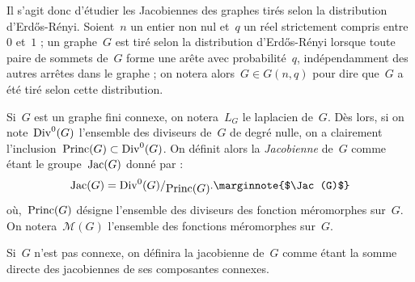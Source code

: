 \vspace*{0.3cm}
	Il s'agit donc d'étudier les Jacobiennes des graphes tirés selon la distribution d'Erd\H{o}s-Rényi. Soient~$n$ un entier non nul et~$q$ un réel strictement compris entre~$0$ et~$1$ ; un graphe~$G$ est tiré selon la distribution d'Erd\H{o}s-Rényi lorsque toute paire de sommets de~$G$ forme une arête avec probabilité~$q$, indépendamment des autres arrêtes dans le graphe ; on notera alors~$G\in G(n,q)$ pour dire que~$G$ a été tiré selon cette distribution.
	
	Si~$G$ est un graphe fini connexe, on notera~$L_G$ le laplacien de~$G$. Dès lors, si on note~$\operatorname{Div}^0(G)$ l'ensemble des diviseurs de~$G$ de degré nulle, on a clairement l'inclusion~$\operatorname{Princ}(G) \subset \operatorname{Div}^0(G)$. On définit alors la \emph{Jacobienne} de~$G$ comme étant le groupe~$\operatorname{Jac}(G)$ donné par :
	\[
		\Jac(G) = \quotient{\Div^0(G)}{\Princ(G)}.\text{\marginnote{$\Jac(G)$}}
	\]
	où,~$\operatorname{Princ}(G)$ désigne l'ensemble des diviseurs des fonction méromorphes sur~$G$. On notera~$\mathcal{M}(G)$ l'ensemble des fonctions méromorphes sur~$G$.
	
	 Si~$G$ n'est pas connexe, on définira la jacobienne de~$G$ comme étant la somme directe des jacobiennes de ses composantes connexes. 